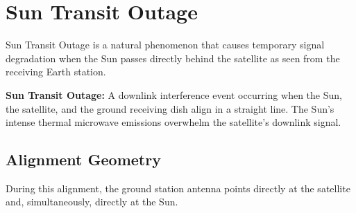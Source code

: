 \documentclass[12pt,a4paper]{article}
\begin{document}
\section{Sun Transit Outage}

Sun Transit Outage is a natural phenomenon that causes temporary signal degradation when the Sun passes directly behind the satellite as seen from the receiving Earth station.

\begin{tcolorbox}[defbox]
\textbf{Sun Transit Outage:} A downlink interference event occurring when the Sun, the satellite, and the ground receiving dish align in a straight line. The Sun's intense thermal microwave emissions overwhelm the satellite's downlink signal.
\end{tcolorbox}

\subsection{Alignment Geometry}
During this alignment, the ground station antenna points directly at the satellite and, simultaneously, directly at the Sun.

\begin{tcolorbox}[tikzbox, title={Sun Transit Outage Alignment}]
\centering
{}
\end{tcolorbox}
\end{document}

